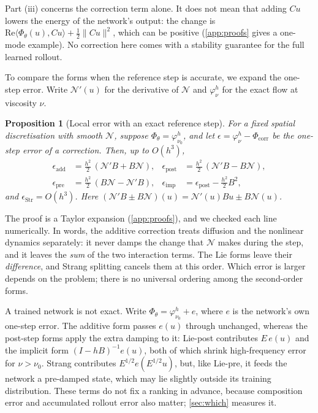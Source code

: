 \documentclass{article}
\theoremstyle{plain}
\newtheorem{proposition}{Proposition}
\newcommand{\add}{additive correction\xspace}
\newcommand{\N}{\mathcal{N}}
\begin{document}
Part (iii) concerns the correction term alone.
It does not mean that adding $Cu$ lowers the energy of the network's output: the change is $\mathrm{Re}\langle\Phi_\theta(u),Cu\rangle+\tfrac12\|Cu\|^2$, which can be positive (\cref{app:proofs} gives a one-mode example).
No correction here comes with a stability guarantee for the full learned rollout.

To compare the forms when the reference step is accurate, we expand the one-step error.
Write $\N'(u)$ for the derivative of $\N$ and $\varphi^h_\nu$ for the exact flow at viscosity $\nu$.

\begin{proposition}[Local error with an exact reference step]
\label{prop:local}
For a fixed spatial discretisation with smooth $\N$, suppose $\Phi_\theta=\varphi^h_{\nu_0}$, and let $\epsilon=\varphi^h_\nu-\Phi_{\mathrm{corr}}$ be the one-step error of a correction. Then, up to $O(h^3)$,
\begin{align*}
\epsilon_{\mathrm{add}} &= \tfrac{h^2}{2}\,(\N'B+B\N), &
\epsilon_{\mathrm{post}} &= \tfrac{h^2}{2}\,(\N'B-B\N),\\
\epsilon_{\mathrm{pre}} &= \tfrac{h^2}{2}\,(B\N-\N'B), &
\epsilon_{\mathrm{imp}} &= \epsilon_{\mathrm{post}}-\tfrac{h^2}{2}B^2,
\end{align*}
and $\epsilon_{\mathrm{Str}}=O(h^3)$. Here $(\N'B\pm B\N)(u)=\N'(u)Bu\pm B\N(u)$.
\end{proposition}

The proof is a Taylor expansion (\cref{app:proofs}), and we checked each line numerically.
In words, the \add treats diffusion and the nonlinear dynamics separately: it never damps the change that $\N$ makes during the step, and it leaves the \emph{sum} of the two interaction terms.
The Lie forms leave their \emph{difference}, and Strang splitting cancels them at this order.
Which error is larger depends on the problem; there is no universal ordering among the second-order forms.

A trained network is not exact.
Write $\Phi_\theta=\varphi^h_{\nu_0}+e$, where $e$ is the network's own one-step error.
The additive form passes $e(u)$ through unchanged, whereas the post-step forms apply the extra damping to it: Lie-post contributes $E\,e(u)$ and the implicit form $(I-hB)^{-1}e(u)$, both of which shrink high-frequency error for $\nu>\nu_0$.
Strang contributes $E^{1/2}e(E^{1/2}u)$, but, like Lie-pre, it feeds the network a pre-damped state, which may lie slightly outside its training distribution.
These terms do not fix a ranking in advance, because composition error and accumulated rollout error also matter; \cref{sec:which} measures it.
\end{document}
